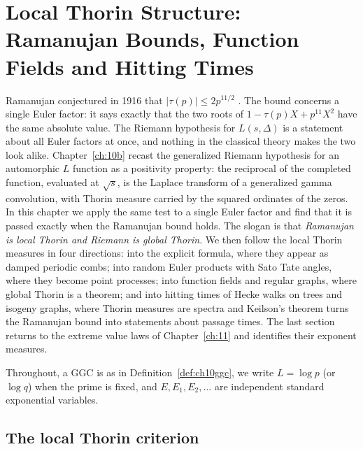 \chapter[Local Thorin Structure]{Local Thorin Structure: Ramanujan Bounds, Function Fields and Hitting Times}\label{ch:10c}

Ramanujan conjectured in 1916 that $|\tau(p)|\le2p^{11/2}$ \cite{ramanujan1916}. The bound concerns a single Euler factor: it says exactly that the two roots of $1-\tau(p)X+p^{11}X^2$ have the same absolute value. The Riemann hypothesis for $L(s,\Delta)$ is a statement about all Euler factors at once, and nothing in the classical theory makes the two look alike. Chapter~\ref{ch:10b} recast the generalized Riemann hypothesis for an automorphic $L$ function as a positivity property: the reciprocal of the completed function, evaluated at $\sqrt s$, is the Laplace transform of a generalized gamma convolution, with Thorin measure carried by the squared ordinates of the zeros. In this chapter we apply the same test to a single Euler factor and find that it is passed exactly when the Ramanujan bound holds. The slogan is that \emph{Ramanujan is local Thorin and Riemann is global Thorin}. We then follow the local Thorin measures in four directions: into the explicit formula, where they appear as damped periodic combs; into random Euler products with Sato Tate angles, where they become point processes; into function fields and regular graphs, where global Thorin is a theorem; and into hitting times of Hecke walks on trees and isogeny graphs, where Thorin measures are spectra and Keilson's theorem turns the Ramanujan bound into statements about passage times. The last section returns to the extreme value laws of Chapter~\ref{ch:11} and identifies their exponent measures.

Throughout, a GGC is as in Definition~\ref{def:ch10ggc}, we write $L=\log p$ (or $\log q$) when the prime is fixed, and $E,E_1,E_2,\dots$ are independent standard exponential variables.

\section{The local Thorin criterion}

